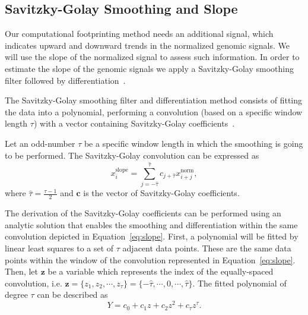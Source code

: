 \subsection{Savitzky-Golay Smoothing and Slope}
\label{sec:savitzkygolay.smoothing.slope}

Our computational footprinting method needs an additional signal, which indicates upward and downward trends in the normalized genomic signals. We will use the slope of the normalized signal to assess such information. In order to estimate the slope of the genomic signals we apply a Savitzky-Golay smoothing filter followed by differentiation~\cite{madden1978,luo2005}.

The Savitzky-Golay smoothing filter and differentiation method consists of fitting the data into a polynomial, performing a convolution (based on a specific window length $\tau$) with a vector containing Savitzky-Golay coefficients~\cite{madden1978}.

Let an odd-number $\tau$ be a specific window length in which the smoothing is going to be performed. The Savitzky-Golay convolution can be expressed as
\begin{equation}
  \label{eq:slope}
  {x}^{\text{slope}}_{i} = \sum\limits_{j=-\hat{\tau}}^{\hat{\tau}} {c}_{j+\hat{\tau}} {x}^{\text{norm}}_{i+j},
\end{equation}
where $\hat{\tau}=\frac{\tau-1}{2}$ and $\mathbf{c}$ is the vector of Savitzky-Golay coefficients.

The derivation of the Savitzky-Golay coefficients can be performed using an analytic solution that enables the smoothing and differentiation within the same convolution depicted in Equation~\ref{eq:slope}. First, a polynomial will be fitted by linear least squares to a set of $\tau$ adjacent data points. These are the same data points within the window of the convolution represented in Equation~\ref{eq:slope}. Then, let $\mathbf{z}$ be a variable which represents the index of the equally-spaced convolution, i.e. $\mathbf{z} = \{ {z}_{1}, {z}_{2}, \cdots, {z}_{\tau} \} = \{ -\hat{\tau}, \cdots, 0, \cdots, \hat{\tau}\}$. The fitted polynomial of degree $\tau$ can be described as
\begin{equation}
  \label{eq:sg.polynomial}
  Y = {c}_{0} + {c}_{1}{z} + {c}_{2}{z}^{2} + {c}_{\tau}{z}^{\tau}.
\end{equation}

